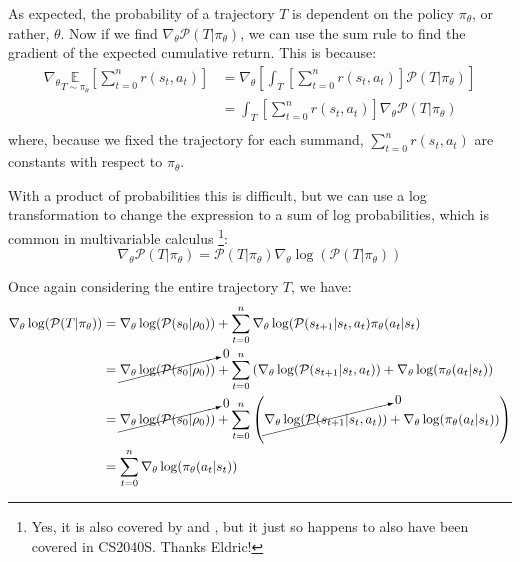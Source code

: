 \documentclass{article} %
\begin{document}
As expected, the probability of a trajectory $T$ is dependent on the policy $\pi_\theta$, or rather, $\theta$.
Now if we find $\nabla_{\theta} \mathcal{P}(T | \pi_\theta)$, we can use the sum rule to find the gradient of the expected cumulative return.
This is because:
\begin{equation} \label{gradient_obj}
    \begin{aligned}
    \nabla_\theta \underset{T \sim \pi_\theta}{\mathbb{E}} \left[ \sum_{t=0}^{n} r(s_t, a_t) \right] 
        &= \nabla_\theta \left[ \int_{T} \left[\sum_{t=0}^{n} r(s_t, a_t) \right] \mathcal{P}(T | \pi_\theta) \right] \\
        &= \int_{T} \left[\sum_{t=0}^{n} r(s_t, a_t) \right] \nabla_\theta \mathcal{P}(T | \pi_\theta) \\
    \end{aligned}
\end{equation}
where, because we fixed the trajectory for each summand, $\sum_{t=0}^{n} r(s_t, a_t)$ are constants with respect to $\pi_\theta$.

With a product of probabilities this is difficult, but we can use a log transformation to change the expression to a sum of log probabilities, 
which is common in multivariable calculus 
\footnote{Yes, it is also covered by \cite{SpinningUp-2018} and \cite{Williams-1992}, but it just so happens to also have been covered in CS2040S. Thanks Eldric!}:
\begin{equation} \label{log_trick}
    \nabla_\theta \mathcal{P}(T | \pi_\theta) = \mathcal{P}(T | \pi_\theta) \nabla_\theta \log(\mathcal{P}(T | \pi_\theta))
\end{equation}

Once again considering the entire trajectory $T$, we have:
\begin{equation} \label{gradient_traj}
    \begin{aligned}
        \nabla_\theta \log(\mathcal{P}(T | \pi_\theta)) & = \nabla_\theta \log(\mathcal{P}(s_0 | \rho_0)) + \sum_{t=0}^{n} \nabla_\theta \log(\mathcal{P}(s_{t + 1} | s_t, a_t) \pi_\theta(a_t | s_t) \\
        & = \cancelto{0}{\nabla_\theta \log(\mathcal{P}(s_0 | \rho_0))} + \sum_{t=0}^{n} \left( \nabla_\theta \log(\mathcal{P}(s_{t + 1} | s_t, a_t)) + \nabla_\theta \log(\pi_\theta(a_t | s_t) \right)\\
        & = \cancelto{0}{\nabla_\theta \log(\mathcal{P}(s_0 | \rho_0))} + \sum_{t=0}^{n} \left( \cancelto{0}{\nabla_\theta \log(\mathcal{P}(s_{t + 1} | s_t, a_t))} + \nabla_\theta \log(\pi_\theta(a_t | s_t)) \right)\\
        & = \sum_{t=0}^{n} \nabla_\theta \log(\pi_\theta(a_t | s_t)) \\
    \end{aligned}
\end{equation}
\end{document}
